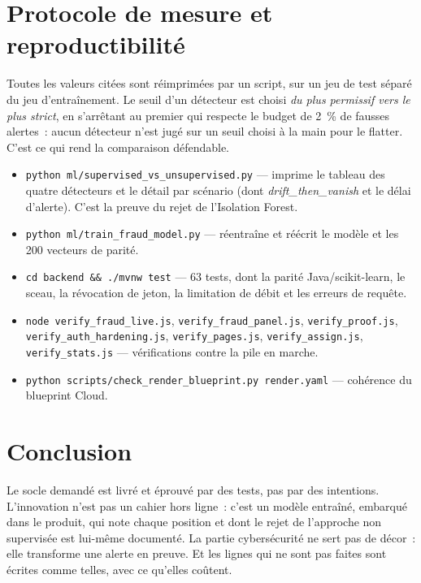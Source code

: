 \documentclass[11pt,a4paper]{article}
\begin{document}
\section{Protocole de mesure et reproductibilit\'e}
Toutes les valeurs cit\'ees sont r\'eimprim\'ees par un script, sur un jeu de test s\'epar\'e du jeu d'entra\^inement. Le seuil d'un d\'etecteur est choisi \emph{du plus permissif vers le plus strict}, en s'arr\^etant au premier qui respecte le budget de 2~\% de fausses alertes~: aucun d\'etecteur n'est jug\'e sur un seuil choisi \`a la main pour le flatter. C'est ce qui rend la comparaison d\'efendable.

\begin{itemize}[leftmargin=1.4em]
  \item \texttt{python ml/supervised\_vs\_unsupervised.py} --- imprime le tableau des quatre d\'etecteurs et le d\'etail par sc\'enario (dont \emph{drift\_then\_vanish} et le d\'elai d'alerte). C'est la preuve du rejet de l'Isolation Forest.
  \item \texttt{python ml/train\_fraud\_model.py} --- r\'eentra\^ine et r\'e\'ecrit le mod\`ele et les 200 vecteurs de parit\'e.
  \item \texttt{cd backend \&\& ./mvnw test} --- 63 tests, dont la parit\'e Java/scikit-learn, le sceau, la r\'evocation de jeton, la limitation de d\'ebit et les erreurs de requ\^ete.
  \item \texttt{node verify\_fraud\_live.js}, \texttt{verify\_fraud\_panel.js}, \texttt{verify\_proof.js}, \texttt{verify\_auth\_hardening.js}, \texttt{verify\_pages.js}, \texttt{verify\_assign.js}, \texttt{verify\_stats.js} --- v\'erifications contre la pile en marche.
  \item \texttt{python scripts/check\_render\_blueprint.py render.yaml} --- coh\'erence du blueprint Cloud.
\end{itemize}

\section*{Conclusion}
Le socle demand\'e est livr\'e et \'eprouv\'e par des tests, pas par des intentions. L'innovation n'est pas un cahier hors ligne~: c'est un mod\`ele entra\^in\'e, embarqu\'e dans le produit, qui note chaque position et dont le rejet de l'approche non supervis\'ee est lui-m\^eme document\'e. La partie cybers\'ecurit\'e ne sert pas de d\'ecor~: elle transforme une alerte en preuve. Et les lignes qui ne sont pas faites sont \'ecrites comme telles, avec ce qu'elles co\^utent.
\end{document}
